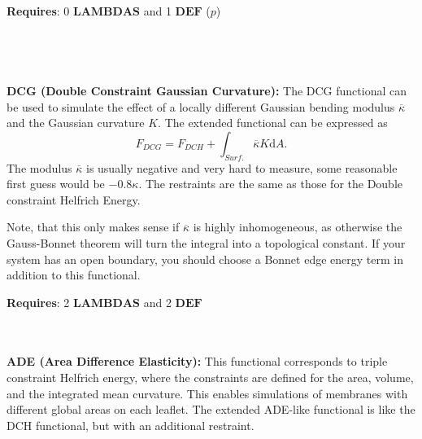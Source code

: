 \documentclass[11pt]{article}
\newcommand{\D}[1]{\mathrm{d#1}}
\begin{document}
\noindent
\textbf{Requires}: 0 $\textbf{LAMBDAS}$ and 1 $\textbf{DEF}$ ($p$) \\
\noindent \\
\vspace{0.2 cm} \\
\noindent \\
\vspace{0.2 cm} \\
\textbf{DCG (Double Constraint Gaussian Curvature):}
The DCG functional can be used to simulate the effect of a locally different Gaussian bending modulus $\overline{\kappa}$ and the Gaussian curvature $K$. The extended functional can be expressed as
 \begin{equation}
 F_{DCG} = F_{DCH} + \int_{Surf.} \overline{\kappa}K  \mathrm{d}A.
 \end{equation}
The modulus $\overline{\kappa}$ is usually negative and very hard to measure, some reasonable first guess would be $-0.8 \kappa$.  The restraints are the same as those for the Double constraint Helfrich Energy.
\begin{tcolorbox}[colback=orange!5!white,colframe=orange!75!black,title=Clarification]
    Note, that this only makes sense if $\overline{\kappa}$ is highly inhomogeneous, as otherwise the Gauss-Bonnet theorem will turn the integral into a topological constant. If your system has an open boundary, you should choose a Bonnet edge energy term in addition to this functional. 
\end{tcolorbox}

\noindent
\textbf{Requires}: 2 $\textbf{LAMBDAS}$ and 2 $\textbf{DEF}$  \\
\noindent \\
\vspace{0.2 cm} \\

\noindent

\noindent
\textbf{ADE (Area Difference Elasticity):} 
This functional corresponds to triple constraint Helfrich energy, where the constraints are defined for the area, volume, and the integrated mean curvature. This enables simulations of membranes with different global areas on each leaflet. The extended ADE-like functional is like the DCH functional, but with an additional restraint.
\end{document}
